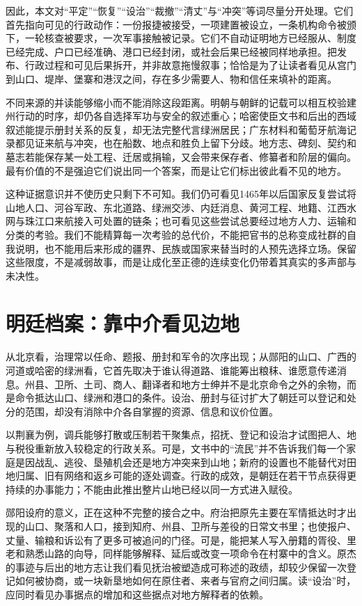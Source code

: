 因此，本文对“平定”“恢复”“设治”“裁撤”“清丈”与“冲突”等词尽量分开处理。它们首先指向可见的行政动作：一份报捷被接受，一项建置被设立，一条机构命令被颁下，一轮核查被要求，一次军事接触被记录。它们不自动证明地方已经服从、制度已经完成、户口已经准确、港口已经封闭，或社会后果已经被同样地承担。把发布、行政过程和可见后果拆开，并非故意拖慢叙事；恰恰是为了让读者看见从宫门到山口、堤岸、堡寨和港汊之间，存在多少需要人、物和信任来填补的距离。

不同来源的并读能够缩小而不能消除这段距离。明朝与朝鲜的记载可以相互校验建州行动的时序，却仍各自选择军功与安全的叙述重心；哈密使臣文书和后出的西域叙述能提示册封关系的反复，却无法完整代言绿洲居民；广东材料和葡萄牙航海记录都见证来航与冲突，也在船数、地点和胜负上留下分歧。地方志、碑刻、契约和墓志若能保存某一处工程、迁居或捐输，又会带来保存者、修纂者和阶层的偏向。最有价值的不是强迫它们说出同一个答案，而是让它们标出彼此看不见的地方。

这种证据意识并不使历史只剩下不可知。我们仍可看见1465年以后国家反复尝试将山地人口、河谷军政、东北道路、绿洲交涉、内廷消息、黄河工程、地籍、江西水网与珠江口来航接入可处置的链条；也可看见这些尝试总要经过地方人力、运输和分类的考验。我们不能精算每一次考验的总代价，不能把官书的总称变成社群的自我说明，也不能用后来形成的疆界、民族或国家来替当时的人预先选择立场。保留这些限度，不是减弱故事，而是让成化至正德的连续变化仍带着其真实的多声部与未决性。
\section{明廷档案：靠中介看见边地}

从北京看，治理常以任命、题报、册封和军令的次序出现；从郧阳的山口、广西的河道或哈密的绿洲看，它首先取决于谁认得道路、谁能筹出粮秣、谁愿意传递消息。州县、卫所、土司、商人、翻译者和地方士绅并不是北京命令之外的余物，而是命令抵达山口、绿洲和港口的条件。设治、册封与征讨扩大了朝廷可以登记和处分的范围，却没有消除中介各自掌握的资源、信息和议价位置。

以荆襄为例，调兵能够打散或压制若干聚集点，招抚、登记和设治才试图把人、地与税役重新放入较稳定的行政关系。可是，文书中的“流民”并不告诉我们每一个家庭是因战乱、逃役、垦殖机会还是地方冲突来到山地；新府的设置也不能替代对田地归属、旧有网络和返乡可能的逐处调查。行政的成效，是朝廷在若干节点获得更持续的办事能力；不能由此推出整片山地已经以同一方式进入赋役。

郧阳设府的意义，正在这种不完整的接合之中。府治把原先主要在军情抵达时才出现的山口、聚落和人口，接到知府、州县、卫所与差役的日常文书里；也使报户、丈量、输粮和诉讼有了更多可被追问的门径。可是，能把某人写入册籍的胥役、里老和熟悉山路的向导，同样能够解释、延后或改变一项命令在村寨中的含义。原杰的事迹与后出的地方志让我们看见抚治被塑造成可称述的政绩，却较少保留一次登记如何被协商，或一块新垦地如何在原住者、来者与官府之间归属。读“设治”时，应同时看见办事据点的增加和这些据点对地方解释者的依赖。


